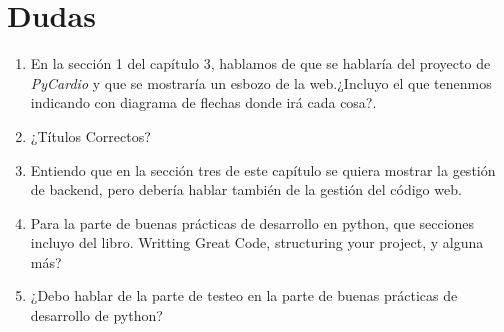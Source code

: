\chapter*{Dudas}
\begin{enumerate}
    \item En la sección 1 del capítulo 3, hablamos de que se hablaría del proyecto de \emph{PyCardio} y que se mostraría un esbozo de la web.¿Incluyo el que tenenmos indicando con diagrama de flechas donde irá cada cosa?.
    \item ¿Títulos Correctos?
    \item Entiendo que en la sección tres de este capítulo se quiera mostrar la gestión de backend, pero debería hablar también de la gestión del código web.
    \item Para la parte de buenas prácticas de desarrollo en python, que secciones incluyo del libro. Writting Great Code, structuring your project, y alguna más?
    \item ¿Debo hablar de la parte de testeo en la parte de buenas prácticas de desarrollo de python?
\end{enumerate}
